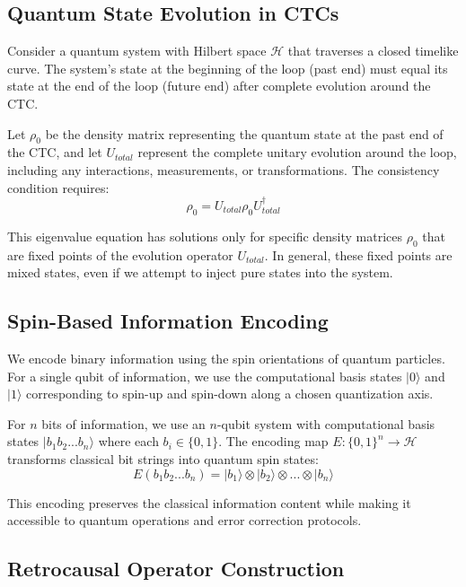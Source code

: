 \documentclass[12pt,a4paper]{article}
\begin{document}
\subsection{Quantum State Evolution in CTCs}

Consider a quantum system with Hilbert space $\mathcal{H}$ that traverses a closed timelike curve. The system's state at the beginning of the loop (past end) must equal its state at the end of the loop (future end) after complete evolution around the CTC.

Let $\rho_0$ be the density matrix representing the quantum state at the past end of the CTC, and let $U_{total}$ represent the complete unitary evolution around the loop, including any interactions, measurements, or transformations. The consistency condition requires:
\begin{equation}
\rho_0 = U_{total} \rho_0 U_{total}^\dagger
\end{equation}

This eigenvalue equation has solutions only for specific density matrices $\rho_0$ that are fixed points of the evolution operator $U_{total}$. In general, these fixed points are mixed states, even if we attempt to inject pure states into the system.

\subsection{Spin-Based Information Encoding}

We encode binary information using the spin orientations of quantum particles. For a single qubit of information, we use the computational basis states $|0\rangle$ and $|1\rangle$ corresponding to spin-up and spin-down along a chosen quantization axis.

For $n$ bits of information, we use an $n$-qubit system with computational basis states $|b_1b_2...b_n\rangle$ where each $b_i \in \{0,1\}$. The encoding map $E: \{0,1\}^n \rightarrow \mathcal{H}$ transforms classical bit strings into quantum spin states:
\begin{equation}
E(b_1b_2...b_n) = |b_1\rangle \otimes |b_2\rangle \otimes ... \otimes |b_n\rangle
\end{equation}

This encoding preserves the classical information content while making it accessible to quantum operations and error correction protocols.

\subsection{Retrocausal Operator Construction}
\end{document}
